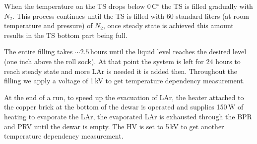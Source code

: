 \documentclass[a4paper,12pt]{article}
\begin{document}
When the temperature on the TS drops below 0\,C$^\circ$ the TS is filled gradually with $N_2$. This process continues until the TS is filled with 60 standard liters (at room temperature and pressure) of $N_2$, once steady state is achieved this amount results in the TS bottom part being full. 

The entire filling takes $\sim2.5$\,hours until the liquid level reaches the desired level (one inch above the roll sock). At that point the system is left for 24 hours to reach steady state and more LAr is needed it is added then. Throughout the filling we apply a voltage of 1\,kV to get temperature dependency measurement.

At the end of a run, to speed up the evacuation of LAr, the heater attached to the copper brick at the bottom of the dewar is operated and supplies 150\,W of heating to evaporate the LAr, the evaporated LAr is exhausted through the BPR and PRV until the dewar is empty. The HV is set to 5\,kV to get another temperature dependency measurement. 
\end{document}
